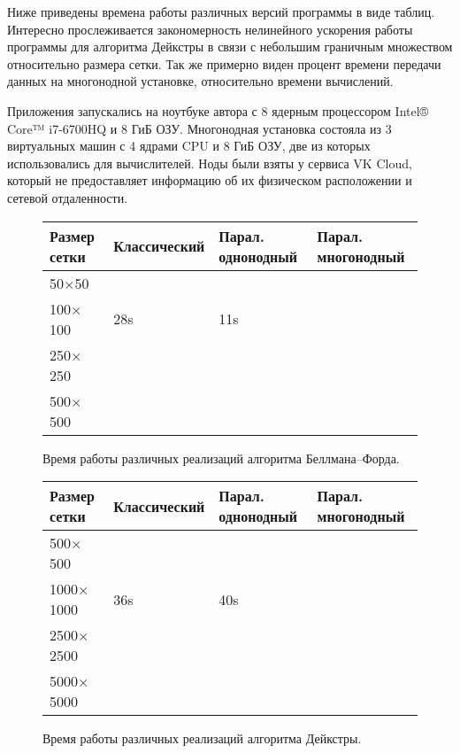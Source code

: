 Ниже приведены времена работы различных версий программы в виде таблиц.
Интересно прослеживается закономерность нелинейного ускорения работы программы для алгоритма Дейкстры в связи с небольшим граничным множеством относительно размера сетки. Так же примерно виден процент времени передачи данных на многонодной установке, относительно времени вычислений.

Приложения запускались на ноутбуке автора с 8 ядерным процессором Intel® Core™ i7-6700HQ и 8 ГиБ ОЗУ.
Многонодная установка состояла из 3 виртуальных машин с 4 ядрами CPU и 8 ГиБ ОЗУ, две из которых использовались для вычислителей. Ноды были взяты у сервиса VK Cloud, который не предоставляет информацию об их физическом расположении и сетевой отдаленности.

\begin{figure}[h]
    \centering
    \begin{tabular}{ | l | l | l | l |}
        \hline
        Размер сетки & Классический & Парал. однонодный & Парал. многонодный \\ \hline
        50$\times$50 & & & \\
        100$\times$100 & 28s & 11s & \\
        250$\times$250 & & & \\
        500$\times$500 & & & \\
        \hline
    \end{tabular}
\caption{Время работы различных реализаций алгоритма Беллмана--Форда.}
\end{figure}

\begin{figure}[h]
    \centering
    \begin{tabular}{ | l | l | l | l |}
        \hline
        Размер сетки & Классический & Парал. однонодный & Парал. многонодный \\ \hline
        500$\times$500 & & & \\
        1000$\times$1000 & 36s & 40s & \\
        2500$\times$2500 & & & \\
        5000$\times$5000 & & & \\
        \hline
    \end{tabular}
    \caption{Время работы различных реализаций алгоритма Дейкстры.}
\end{figure}